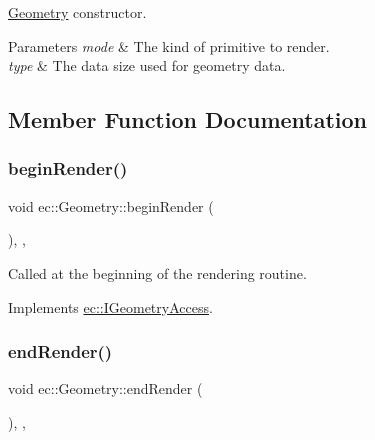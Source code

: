\mbox{\hyperlink{classec_1_1_geometry}{Geometry}} constructor. 


\begin{DoxyParams}{Parameters}
{\em mode} & The kind of primitive to render. \\
\hline
{\em type} & The data size used for geometry data. \\
\hline
\end{DoxyParams}


\subsection{Member Function Documentation}
\mbox{\label{classec_1_1_geometry_aeca5f0e52e7c2e4b352ede1a6e7c3f5b}} 
\subsubsection{\texorpdfstring{begin\+Render()}{beginRender()}}
{\footnotesize\ttfamily void ec\+::\+Geometry\+::begin\+Render (\begin{DoxyParamCaption}{ }\end{DoxyParamCaption})\hspace{0.3cm}{\ttfamily [override]}, {\ttfamily [protected]}, {\ttfamily [virtual]}}



Called at the beginning of the rendering routine. 



Implements \mbox{\hyperlink{classec_1_1_i_geometry_access_a17a87aca44e2a23a6185e78262e02652}{ec\+::\+I\+Geometry\+Access}}.

\mbox{\label{classec_1_1_geometry_ae0352702162501df185517e84c3b02bd}} 
\subsubsection{\texorpdfstring{end\+Render()}{endRender()}}
{\footnotesize\ttfamily void ec\+::\+Geometry\+::end\+Render (\begin{DoxyParamCaption}{ }\end{DoxyParamCaption})\hspace{0.3cm}{\ttfamily [override]}, {\ttfamily [protected]}, {\ttfamily [virtual]}}



